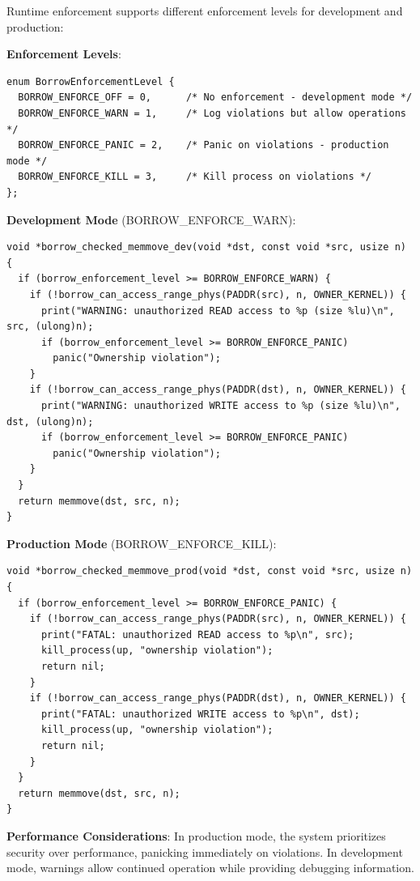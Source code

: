 \documentclass[11pt,letterpaper]{article}
\begin{document}
Runtime enforcement supports different enforcement levels for development and production:

\textbf{Enforcement Levels}:

\begin{lstlisting}
enum BorrowEnforcementLevel {
  BORROW_ENFORCE_OFF = 0,      /* No enforcement - development mode */
  BORROW_ENFORCE_WARN = 1,     /* Log violations but allow operations */
  BORROW_ENFORCE_PANIC = 2,    /* Panic on violations - production mode */
  BORROW_ENFORCE_KILL = 3,     /* Kill process on violations */
};
\end{lstlisting}

\textbf{Development Mode} (BORROW\_ENFORCE\_WARN):

\begin{lstlisting}
void *borrow_checked_memmove_dev(void *dst, const void *src, usize n) {
  if (borrow_enforcement_level >= BORROW_ENFORCE_WARN) {
    if (!borrow_can_access_range_phys(PADDR(src), n, OWNER_KERNEL)) {
      print("WARNING: unauthorized READ access to %p (size %lu)\n", src, (ulong)n);
      if (borrow_enforcement_level >= BORROW_ENFORCE_PANIC)
        panic("Ownership violation");
    }
    if (!borrow_can_access_range_phys(PADDR(dst), n, OWNER_KERNEL)) {
      print("WARNING: unauthorized WRITE access to %p (size %lu)\n", dst, (ulong)n);
      if (borrow_enforcement_level >= BORROW_ENFORCE_PANIC)
        panic("Ownership violation");
    }
  }
  return memmove(dst, src, n);
}
\end{lstlisting}

\textbf{Production Mode} (BORROW\_ENFORCE\_KILL):

\begin{lstlisting}
void *borrow_checked_memmove_prod(void *dst, const void *src, usize n) {
  if (borrow_enforcement_level >= BORROW_ENFORCE_PANIC) {
    if (!borrow_can_access_range_phys(PADDR(src), n, OWNER_KERNEL)) {
      print("FATAL: unauthorized READ access to %p\n", src);
      kill_process(up, "ownership violation");
      return nil;
    }
    if (!borrow_can_access_range_phys(PADDR(dst), n, OWNER_KERNEL)) {
      print("FATAL: unauthorized WRITE access to %p\n", dst);
      kill_process(up, "ownership violation");
      return nil;
    }
  }
  return memmove(dst, src, n);
}
\end{lstlisting}

\textbf{Performance Considerations}: In production mode, the system prioritizes security over performance, panicking immediately on violations. In development mode, warnings allow continued operation while providing debugging information.
\end{document}
